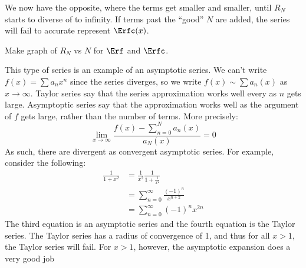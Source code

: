 \documentclass[crop=false,class=book,oneside]{standalone}
\begin{document}
        We now have the opposite, where the terms get smaller
        and smaller, until $R_{N}$ starts to diverse of to
        infinity. If terms past the ``good'' $N$ are added,
        the series will fail to accurate represent $\Erfc(x)$.
        \par\hfill\par
        Make graph of $R_{N}$ vs $N$ for $\Erf$ and $\Erfc$.
        \par\hfill\par
        This type of series is an example of an asymptotic series.
        We can't write $f(x)=\sum{a}_{n}x^{n}$ since the
        series diverges, so we write
        $f(x)\sim\sum{a}_{n}(x)$ as $x\rightarrow\infty$.
        Taylor series say that the series approximation works
        well every as $n$ gets large. Asymptoptic series say
        that the approximation works well as the argument of
        $f$ gets large, rather than the number of terms.
        More precisely:
        \begin{equation}
            \underset{x\rightarrow\infty}{\lim}
            \frac{f(x)-\sum_{n=0}^{N}a_{n}(x)}{a_{N}(x)}=0
        \end{equation}
        As such, there are divergent as convergent asymptotic
        series. For example, consider the following:
        \begin{align}
            \frac{1}{1+x^{2}}
            &=\frac{1}{x^{2}}\frac{1}{1+\frac{1}{x^{2}}}\\
            &=\sum_{n=0}^{\infty}\frac{(-1)^{n}}{x^{n+2}}\\
            &=\sum_{n=0}^{\infty}(-1)^{n}x^{2n}
        \end{align}
        The third equation is an asymptotic series and the
        fourth equation is the Taylor series. The Taylor
        series has a radius of convergence of 1, and thus for
        all $x>1$, the Taylor series will fail. For
        $x>1$, however, the asymptotic expansion does a very
        good job
\end{document}
